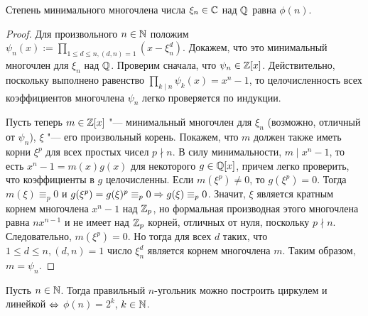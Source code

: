 \begin{theorem}
	Степень минимального многочлена числа $\xi_n \in \mathbb{C}$ над $\mathbb{Q}$ равна $\phi(n)$.
\end{theorem}

\begin{proof}
	Для произвольного $n \in \mathbb{N}$ положим $\psi_n(x) := \prod_{1 \le d \le n, (d, n) = 1}(x - \xi_n^d)$. Докажем, что это минимальный многочлен для $\xi_n$ над $\mathbb{Q}$. Проверим сначала, что $\psi_n \in \mathbb{Z}[x]$. Действительно, поскольку выполнено равенство $\prod_{k \mid n}\psi_k(x) = {x^n - 1}$, то целочисленность всех коэффициентов многочлена $\psi_n$ легко проверяется по индукции.
	\pagebreak
	
	Пусть теперь $m \in \mathbb{Z}[x]$ "--- минимальный многочлен для $\xi_n$ (возможно, отличный от $\psi_n$), $\xi$ "--- его произвольный корень. Покажем, что $m$ должен также иметь корни $\xi^p$ для всех простых чисел $p \nmid n$. В силу минимальности, $m \mid x^n - 1$, то есть $x^n - 1 = m(x)g(x)$ для некоторого $g \in \mathbb{Q}[x]$, причем легко проверить, что коэффициенты в $g$ целочисленны. Если $m(\xi^p) \ne 0$, то $g(\xi^p) = 0$. Тогда $m(\xi) \equiv_p 0$ и $g(\xi^p) = g(\xi)^p \equiv_p 0 \Rightarrow g(\xi) \equiv_p 0$. Значит, $\xi$ является кратным корнем многочлена $x^n - 1$ над $\mathbb{Z}_p$, но формальная производная этого многочлена равна $nx^{n - 1}$ и не имеет над $\mathbb{Z}_p$ корней, отличных от нуля, поскольку $p \nmid n$. Следовательно, $m(\xi^p) = 0$. Но тогда для всех $d$ таких, что $1 \le d \le n, (d, n) = 1$ число $\xi_n^d$ является корнем многочлена $m$. Таким образом, $m = \psi_n$.
\end{proof}

\begin{corollary}
	Пусть $n \in \mathbb{N}$. Тогда правильный $n$-угольник можно построить циркулем и линейкой $\Leftrightarrow$ $\phi(n) = 2^k$, $k \in \mathbb{N}$.
\end{corollary}